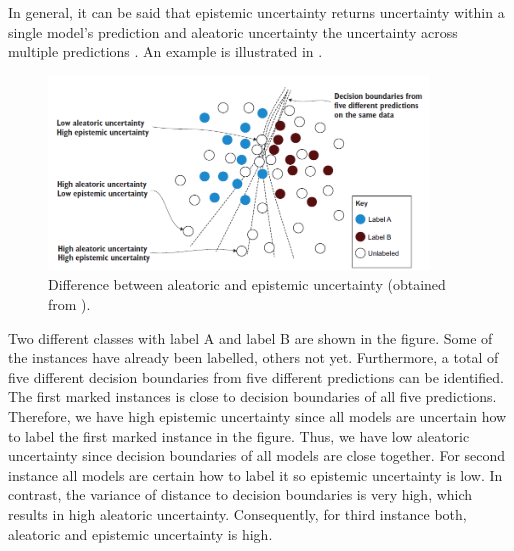 In general, it can be said that epistemic uncertainty returns uncertainty within a single model's prediction and aleatoric uncertainty the uncertainty across multiple predictions \cite{human-in-the-loop}.
An example is illustrated in .
\begin{figure}[t]
  \centering
    \includegraphics[width=0.90\textwidth]{figures/uncertainty_differences.PNG}
  \caption{Difference between aleatoric and epistemic uncertainty (obtained from \cite{human-in-the-loop}).}
  \label{fig:differences_aleatoric_epistemic}
\end{figure}
Two different classes with label A and label B are shown in the figure.
Some of the instances have already been labelled, others not yet.
Furthermore, a total of five different decision boundaries from five different predictions can be identified.
The first marked instances is close to decision boundaries of all five predictions.
Therefore, we have high epistemic uncertainty since all models are uncertain how to label the first marked instance in the figure.
Thus, we have low aleatoric uncertainty since decision boundaries of all models are close together.
For second instance all models are certain how to label it so epistemic uncertainty is low.
In contrast, the variance of distance to decision boundaries is very high, which results in high aleatoric uncertainty.
Consequently, for third instance both, aleatoric and epistemic uncertainty is high.